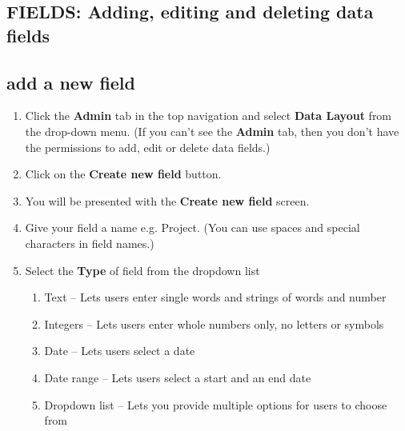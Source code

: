 \documentclass{ctrlo-int-toc}
\begin{document}
\begin{admin}
\clearpage\section[FIELDS: Adding, editing and deleting data fields ]{FIELDS: Adding, editing and deleting data fields }
\subsection[add a new field]{add a new field}
\label{subsec:addfield}
\begin{enumerate}
\item Click the \textbf{Admin} tab in the top navigation and select \textbf{Data Layout} from the drop-down menu. (If you can't see the \textbf{Admin} tab, then you don't have the permissions to add, edit or delete data fields.)
\item Click on the \textbf{Create new field} button. 
\item You will be presented with the \textbf{Create new field} screen.
\item Give your field a name e.g. Project. (You can use spaces and special characters in field names.) 
\item Select the \textbf{Type} of field from the dropdown list

\begin{enumerate}
\item Text -- Lets users enter single words and strings of words and number
\item Integers -- Lets users enter whole numbers only, no letters or symbols
\item Date -- Lets users select a date
\item Date range -- Lets users select a start and an end date
\item Dropdown list -- Lets you provide multiple options for users to choose from


\end{enumerate}
\end{enumerate}
\end{admin}
\end{document}
